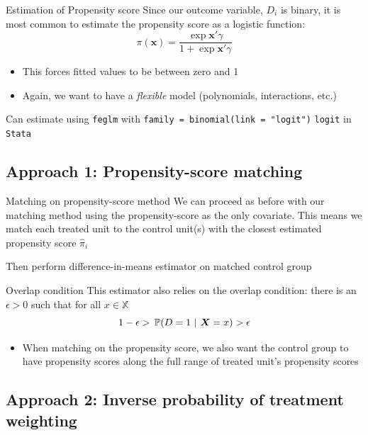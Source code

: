 \documentclass[aspectratio=169,t,11pt,table]{beamer}
\begin{document}
\begin{frame}{Estimation of Propensity score}
  Since our outcome variable, $D_i$ is binary, it is most common to estimate the propensity score as a logistic function:
  $$
    \pi(\bm{x}) = \frac{\exp{\bm{x}' \gamma}}{1 + \exp{\bm{x}' \gamma}}
  $$
  \begin{itemize}
    \item This forces fitted values to be between zero and 1
    \item Again, we want to have a \emph{flexible} model (polynomials, interactions, etc.)
  \end{itemize}

  \pause
  \bigskip
  Can estimate using \texttt{feglm} with \texttt{family = binomial(link = "logit")} \texttt{logit} in \texttt{Stata}
\end{frame}

\subsection{Approach 1: Propensity-score matching}

\begin{frame}{Matching on propensity-score method}
  We can proceed as before with our matching method using the propensity-score as the only covariate. This means we match each treated unit to the control unit(s) with the closest estimated propensity score $\hat{\pi}_i$

  \bigskip
  Then perform difference-in-means estimator on matched control group
\end{frame}

\begin{frame}{Overlap condition}
  This estimator also relies on the overlap condition: there is an $\epsilon > 0$ such that for all $x \in \mathbb{X}$
  $$
    1 - \epsilon > \prob{D = 1}{\bm{X} = x} > \epsilon
  $$
  \begin{itemize}
    \item When matching on the propensity score, we also want the control group to have propensity scores along the full range of treated unit's propensity scores
  \end{itemize}
\end{frame}

\subsection{Approach 2: Inverse probability of treatment weighting}
\end{document}
